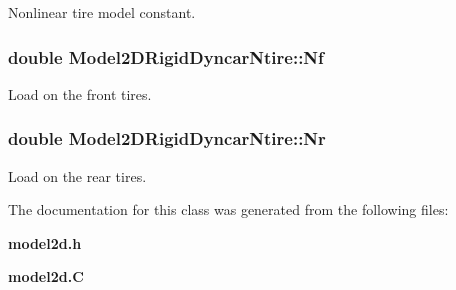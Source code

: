 Nonlinear tire model constant.

\subsubsection{\setlength{\rightskip}{0pt plus 5cm}double Model2DRigid\-Dyncar\-Ntire::Nf}\label{classModel2DRigidDyncarNtire_m1}


Load on the front tires.

\subsubsection{\setlength{\rightskip}{0pt plus 5cm}double Model2DRigid\-Dyncar\-Ntire::Nr}\label{classModel2DRigidDyncarNtire_m2}


Load on the rear tires.



The documentation for this class was generated from the following files:\begin{CompactItemize}
\item 
{\bf model2d.h}\item 
{\bf model2d.C}\end{CompactItemize}
